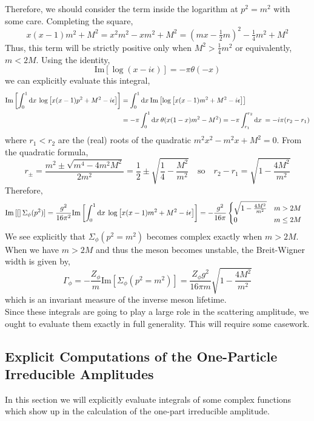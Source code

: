 \documentclass{article}
\begin{document}
Therefore, we should consider the term inside the logarithm at $p^2 = m^2$ with some care. Completing the square,
\[ x(x-1) m^2 + M^2 = x^2 m^2 - x m^2 + M^2 = (mx - \tfrac{1}{2}m)^2 - \tfrac{1}{4} m^2 + M^2 \]
Thus, this term will be strictly positive only when $M^2 > \tfrac{1}{4} m^2$ or equivalently, $m < 2 M$. Using the identity,
\[ \mathrm{Im}\left[ \log{(x - i \epsilon)} \right] = - \pi \theta(-x) \]
we can explicitly evaluate this integral,
\begin{align*}
\mathrm{Im}\left[ \int_{0}^{1} \mathrm{d}x \: \log{\left[ x(x-1)p^2 + M^2 - i \epsilon \right]} \right] & = \int_{0}^{1} \mathrm{d}x \: \mathrm{Im}\left[ \log{\left[ x(x-1)m^2 + M^2 - i \epsilon \right]} \right] 
\\
& = - \pi \int_{0}^{1} \mathrm{d}x \: \theta(x(1-x) m^2 - M^2)  = - \pi \int_{r_1}^{r_2} \mathrm{d}x \: = - i \pi (r_2 - r_1)
\end{align*} 
where $r_1 < r_2$ are the (real) roots of the quadratic $m^2 x^2 - m^2 x + M^2 = 0$. From the quadratic formula, 
\[ r_{\pm} = \frac{m^2 \pm \sqrt{m^4 - 4 m^2 M^2}}{2 m^2} = \frac{1}{2} \pm \sqrt{\frac{1}{4} - \frac{M^2}{m^2}} \quad \text{so} \quad r_2 - r_1 = \sqrt{1 - \frac{4 M^2}{m^2}} \]
Therefore,
\begin{align*}
\mathrm{Im}\left[ [ \right]\Sigma_\phi(p^2)] = \frac{g^2}{16 \pi^2}\mathrm{Im}\left[ \int_{0}^{1} \mathrm{d}x \: \log{\left[ x(x-1)m^2 + M^2 - i \epsilon \right]} \right] & = 
-\frac{g^2}{16 \pi}
\begin{cases}
\sqrt{1 - \frac{4M^2}{m^2}} & m > 2M \\
0 & m \le 2M
\end{cases}
\end{align*}
We see explicitly that $\Sigma_\phi(p^2 = m^2)$ becomes complex exactly when $m > 2 M$. When we have $m > 2 M$ and thus the meson becomes unstable, the Breit-Wigner width is given by,
\[ \Gamma_\phi = - \frac{Z_\phi}{m} \mathrm{Im}[ \Sigma_\phi(p^2 = m^2) ] =  \frac{Z_\phi g^2}{16 \pi m} \sqrt{1 - \frac{4M^2}{m^2}} \]
which is an invariant measure of the inverse meson lifetime. \bigskip\\
Since these integrals are going to play a large role in the scattering amplitude, we ought to evaluate them exactly in full generality. This will require some casework.

\subsection{Explicit Computations of the One-Particle Irreducible Amplitudes}
In this section we will explicitly evaluate integrals of some complex functions which show up in the calculation of the one-part irreducible amplitude. 
\end{document}
